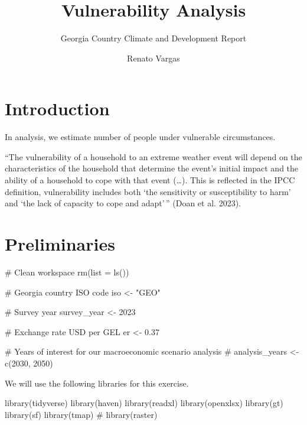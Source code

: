 \documentclass[
  letterpaper,
  DIV=11,
  numbers=noendperiod]{scrartcl}
\title{Vulnerability Analysis}
\subtitle{Georgia Country Climate and Development Report}
\author{Renato Vargas}
\date{}
\newenvironment{Shaded}{}{}
\newcommand{\AttributeTok}[1]{\textcolor[rgb]{0.84,0.23,0.29}{#1}}
\newcommand{\CommentTok}[1]{\textcolor[rgb]{0.42,0.45,0.49}{#1}}
\newcommand{\DecValTok}[1]{\textcolor[rgb]{0.00,0.36,0.77}{#1}}
\newcommand{\FloatTok}[1]{\textcolor[rgb]{0.00,0.36,0.77}{#1}}
\newcommand{\FunctionTok}[1]{\textcolor[rgb]{0.44,0.26,0.76}{#1}}
\newcommand{\NormalTok}[1]{\textcolor[rgb]{0.14,0.16,0.18}{#1}}
\newcommand{\OtherTok}[1]{\textcolor[rgb]{0.44,0.26,0.76}{#1}}
\newcommand{\StringTok}[1]{\textcolor[rgb]{0.01,0.18,0.38}{#1}}
\begin{document}
\maketitle


\section{Introduction}\label{introduction}

In analysis, we estimate number of people under vulnerable
circumstances.

``The vulnerability of a household to an extreme weather event will
depend on the characteristics of the household that determine the
event's initial impact and the ability of a household to cope with that
event (\ldots). This is reflected in the IPCC definition, vulnerability
includes both `the sensitivity or susceptibility to harm' and `the lack
of capacity to cope and adapt'\,'' (Doan et al. 2023).

\section{Preliminaries}\label{preliminaries}

\begin{Shaded}
\begin{Highlighting}[]
\CommentTok{\# Clean workspace}
\FunctionTok{rm}\NormalTok{(}\AttributeTok{list =} \FunctionTok{ls}\NormalTok{())}

\CommentTok{\# Georgia country ISO code}
\NormalTok{iso }\OtherTok{\textless{}{-}} \StringTok{"GEO"}

\CommentTok{\# Survey year}
\NormalTok{survey\_year }\OtherTok{\textless{}{-}} \DecValTok{2023}

\CommentTok{\# Exchange rate USD per GEL}
\NormalTok{er }\OtherTok{\textless{}{-}} \FloatTok{0.37}

\CommentTok{\# Years of interest for our macroeconomic scenario analysis}
\CommentTok{\# analysis\_years \textless{}{-} c(2030, 2050)}
\end{Highlighting}
\end{Shaded}

We will use the following libraries for this exercise.

\begin{Shaded}
\begin{Highlighting}[]
\FunctionTok{library}\NormalTok{(tidyverse)}
\FunctionTok{library}\NormalTok{(haven)}
\FunctionTok{library}\NormalTok{(readxl)}
\FunctionTok{library}\NormalTok{(openxlsx)}
\FunctionTok{library}\NormalTok{(gt)}
\FunctionTok{library}\NormalTok{(sf)}
\FunctionTok{library}\NormalTok{(tmap)}
\CommentTok{\# library(raster)}
\end{Highlighting}
\end{Shaded}
\end{document}
